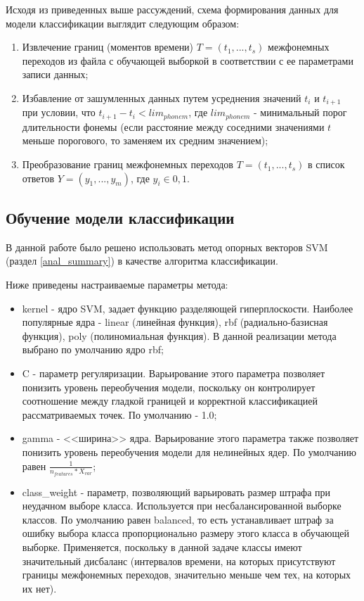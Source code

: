 \documentclass[utf8x, 14pt, oneside, a4paper]{article}
\begin{document}
	Исходя из приведенных выше рассуждений, схема формирования данных для модели классификации выглядит следующим образом:
	
	\begin{enumerate}
		\item Извлечение границ (моментов времени) $T = (t_1,...,t_s)$ межфонемных переходов из файла с обучающей выборкой в соответствии с ее параметрами записи данных;
		\item Избавление от зашумленных данных путем усреднения значений $t_i$ и $t_{i+1}$ при условии, что $t_{i+1} - t_i < lim_{phonem}$, где $lim_{phonem}$ - минимальный порог длительности фонемы (если расстояние между соседними значениями $t$ меньше порогового, то заменяем их средним значением);
		\item Преобразование границ межфонемных переходов $T = (t_1, ..., t_s)$ в список ответов $Y = (y_1,...,y_m)$, где $y_i \in {0, 1}$. 
	\end{enumerate}
	
	\subsection{Обучение модели классификации}\label{features_classification}
	
	В данной работе было решено использовать метод опорных векторов SVM (раздел \ref{anal_summary}) в качестве алгоритма классификации.
	
	Ниже приведены настраиваемые параметры метода:
	
	\begin{itemize}
		\item kernel - ядро SVM, задает функцию разделяющей гиперплоскости. Наиболее популярные ядра - linear (линейная функция), rbf (радиально-базисная функция), poly (полиномиальная функция). В данной реализации метода выбрано по умолчанию ядро rbf;
		\item C - параметр регуляризации. Варьирование этого параметра позволяет понизить уровень переобучения модели, поскольку он контролирует соотношение между гладкой границей и корректной классификацией рассматриваемых точек. По умолчанию - 1.0;
		\item gamma - <<ширина>> ядра. Варьирование этого параметра также позволяет понизить уровень переобучения модели для нелинейных ядер. По умолчанию равен $\frac{1}{n_{features} * X_{var}}$;
		\item class\_weight - параметр, позволяющий варьировать размер штрафа при \linebreak неудачном выборе класса. Используется при несбалансированной выборке классов. По умолчанию равен balanced, то есть устанавливает штраф за ошибку выбора класса пропорционально размеру этого класса в обучающей выборке. Применяется, поскольку в данной задаче классы имеют значительный дисбаланс (интервалов времени, на которых присутствуют границы межфонемных переходов, значительно меньше чем тех, на которых их нет).
	\end{itemize}
\end{document}
